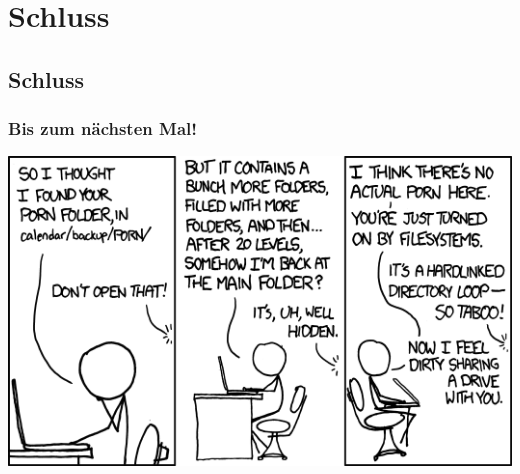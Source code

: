 \section{Schluss}
\subsection{Schluss}
\begin{frame}
\frametitle{Bis zum nächsten Mal!}
\begin{center}
  \includegraphics[width=1 \textheight]{images/xkcd_981.png}
\end{center}
\end{frame}

